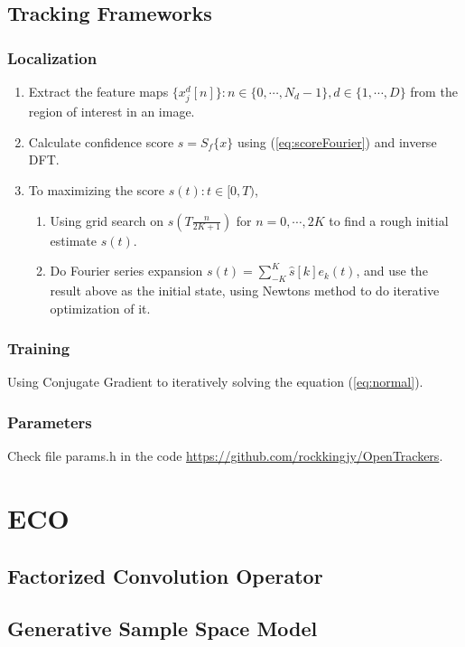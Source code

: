 \documentclass[12pt]{article}
\numberwithin{equation}{section}
\begin{document}
\subsection{Tracking Frameworks}
\subsubsection{Localization}
\begin{enumerate}
	\item Extract the feature maps $\{x^d_j[n]\}: n \in \{0, \cdots, N_d -1\}, d \in \{1, \cdots, D\}$ from the region of interest in an image.
	\item Calculate confidence score $s=S_f\{x\}$ using (\ref{eq:scoreFourier}) and inverse DFT. 
	\item To maximizing the score $s(t): t\in [0,T)$,
		\begin{enumerate}
			\item Using grid search on $s(T\frac{n}{2K+1})$ for $n=0, \cdots, 2K$ to find a rough
			 initial estimate $s(t)$.
			\item Do Fourier series expansion $s(t)=\sum^K_{-K}\hat{s}[k]e_k(t)$, and use the result above
			as the initial state, using Newtons method to do iterative optimization of it.
		\end{enumerate}
\end{enumerate}
\subsubsection{Training}
Using Conjugate Gradient to iteratively solving the equation (\ref{eq:normal}).
\subsubsection{Parameters}
Check file params.h in the code \url{https://github.com/rockkingjy/OpenTrackers}. 
\section{ECO \citep{DanelljanCVPR2017}} 
\subsection{Factorized Convolution Operator}

\subsection{Generative Sample Space Model}
\end{document}
